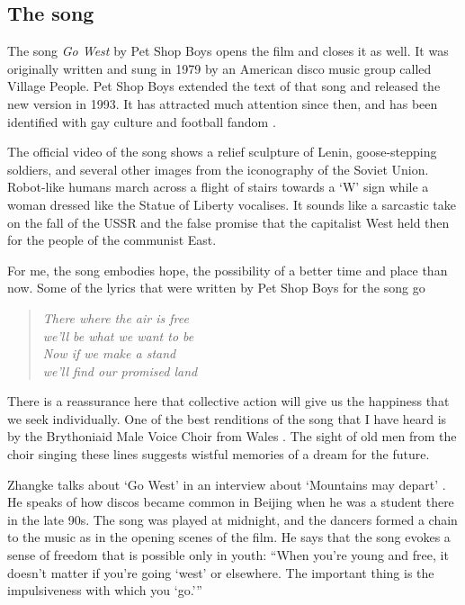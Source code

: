 \documentclass{article}
\begin{document}
\subsection{The song}
\label{sec:njpsvlf6}

The song \emph{Go West} by Pet Shop Boys opens the film and closes it
as well.  It was originally written and sung in 1979 by an American
disco music group called Village People.  Pet Shop Boys extended the
text of that song and released the new version in 1993.  It has
attracted much attention since then, and has been identified with gay
culture and football fandom \parencite{bib:3hf0kuo0}.

The official video of the song \parencite{bib:4dsv5d40} shows a relief
sculpture of Lenin, goose-stepping soldiers, and several other images
from the iconography of the Soviet Union.  Robot-like humans march
across a flight of stairs towards a `W' sign while a woman dressed
like the Statue of Liberty vocalises.  It sounds like a sarcastic take
on the fall of the USSR and the false promise that the capitalist West
held then for the people of the communist East.

For me, the song embodies hope, the possibility of a better time and
place than now.  Some of the lyrics that were written by Pet Shop Boys
for the song go
\begin{verse} \itshape
  There where the air is free \\
  we'll be what we want to be \\
  Now if we make a stand \\
  we'll find our promised land
\end{verse}
There is a reassurance here that collective action will give us the
happiness that we seek individually.  One of the best renditions of
the song that I have heard is by the Brythoniaid Male Voice Choir from
Wales \parencite{bib:4lizl8c7}.  The sight of old men from the choir
singing these lines \parencite{bib:n7kfye4j} suggests wistful memories
of a dream for the future.

Zhangke talks about `Go West' in an interview about `Mountains may
depart' \parencite{bib:zt0dmft0}.  He speaks of how discos became
common in Beijing when he was a student there in the late 90s.  The
song was played at midnight, and the dancers formed a chain to the
music as in the opening scenes of the film.  He says that the song
evokes a sense of freedom that is possible only in youth: ``When
you're young and free, it doesn’t matter if you're going `west' or
elsewhere.  The important thing is the impulsiveness with which you
{`go.'}''
\end{document}
